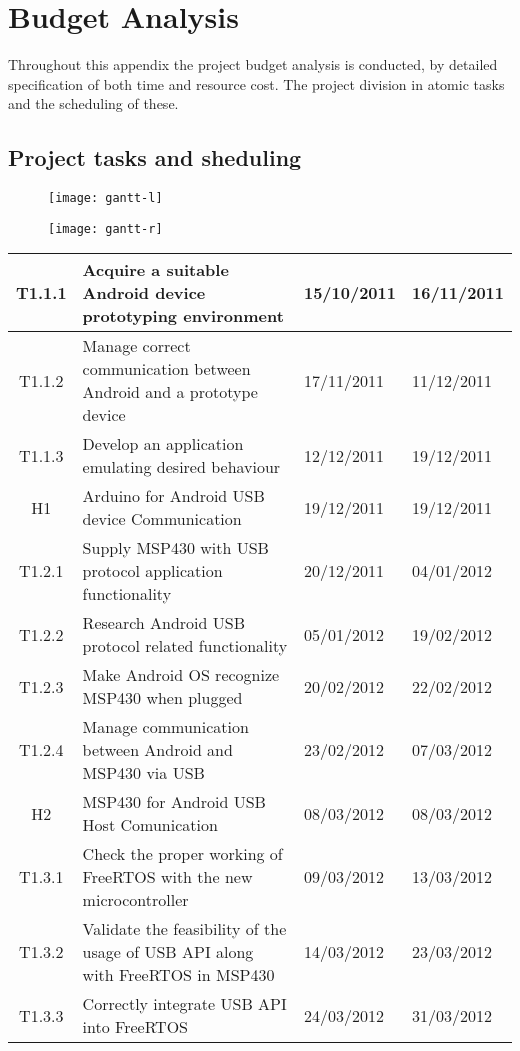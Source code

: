 \chapter{Budget Analysis}
\label{ch:budget}

	Throughout this appendix the project budget analysis is conducted, by detailed specification of both time and resource cost.
	The project division in atomic tasks and the scheduling of these.
	
	\section{Project tasks and sheduling}

		\begin{figure}[h]
			\centering
		    	\texttt{[image: gantt-l]}
			\label{fig:gantL}
		\end{figure}
		\begin{figure}[h]
			\centering
		    	\texttt{[image: gantt-r]}
			\label{fig:gantR}
		\end{figure}

		\begin{tabular}{| c | p{7cm} | l | l |} %
		\hline
T1.1.1 & Acquire a suitable Android device prototyping environment & 15/10/2011 & 16/11/2011\\ \hline
T1.1.2 & Manage correct communication between Android and a prototype device & 17/11/2011 & 11/12/2011\\ \hline
T1.1.3 & Develop an application emulating desired behaviour & 12/12/2011 & 19/12/2011\\ \hline
H1 & Arduino for Android USB device Communication & 19/12/2011 & 19/12/2011\\ \hline
T1.2.1 & Supply MSP430 with USB protocol application functionality & 20/12/2011 & 04/01/2012\\ \hline
T1.2.2 & Research Android USB protocol related functionality & 05/01/2012 & 19/02/2012\\ \hline
T1.2.3 & Make Android OS recognize MSP430 when plugged	 & 20/02/2012 & 22/02/2012\\ \hline
T1.2.4 & Manage communication between Android and MSP430 via USB & 23/02/2012 & 07/03/2012\\ \hline
H2 & MSP430 for Android USB Host Comunication & 08/03/2012 & 08/03/2012\\ \hline
T1.3.1 & Check the proper working of FreeRTOS with the new microcontroller & 09/03/2012 & 13/03/2012\\ \hline
T1.3.2 & Validate the feasibility of the usage of USB API along with FreeRTOS in MSP430 & 14/03/2012 & 23/03/2012\\ \hline
T1.3.3 & Correctly integrate USB API into FreeRTOS & 24/03/2012 & 31/03/2012\\ 
\hline
\end{tabular}\\\\

